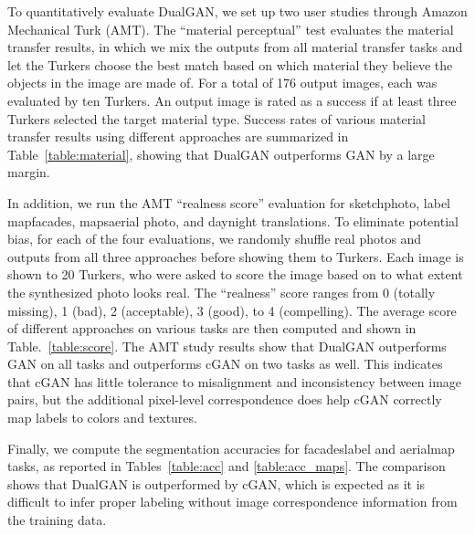 To quantitatively evaluate DualGAN, we set up two user studies through Amazon Mechanical Turk (AMT). 
The ``material perceptual'' test evaluates the material transfer results, in which we mix the outputs 
from all material transfer tasks and let the Turkers choose the best match based on which material they 
believe the objects in the image are made of. For a total of 176 output images, each was evaluated by 
ten Turkers. An output image is rated as a success if at least three Turkers selected the target material type. 
Success rates of various material transfer results using different approaches are summarized in 
Table~\ref{table:material}, showing that DualGAN outperforms GAN by a large margin.

In addition, we run the AMT ``realness score'' evaluation for sketchphoto, label mapfacades, 
mapsaerial photo, and daynight translations. To eliminate potential bias, for each of the four 
evaluations, we randomly shuffle real photos and outputs from all three approaches before showing them to Turkers.  
Each image is shown to 20 Turkers, who were asked to score the image based on to what extent the synthesized photo 
looks real. The ``realness'' score ranges from 0 (totally missing), 1 (bad), 2 (acceptable), 3 (good), to 4 (compelling). The 
average score of different approaches on various tasks are then computed and shown in Table.~\ref{table:score}. The 
AMT study results show that DualGAN outperforms GAN on all tasks and outperforms cGAN on two tasks as well. This 
indicates that cGAN has little tolerance to misalignment and inconsistency between image pairs, but the additional 
pixel-level correspondence does help cGAN correctly map labels to colors and textures.



Finally, we compute the segmentation accuracies for facadeslabel and aerialmap tasks, as reported
in Tables~\ref{table:acc} and \ref{table:acc_maps}. The comparison shows that DualGAN is outperformed by cGAN, which is 
expected as it is difficult to infer proper labeling without image correspondence information from the training data.

